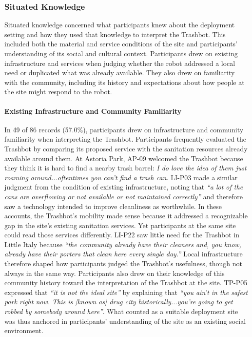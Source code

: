 \subsubsection{Situated Knowledge}
Situated knowledge concerned what participants knew about the deployment setting and how they used that knowledge to interpret the Trashbot. This included both the material and service conditions of the site and participants' understanding of its social and cultural context. Participants drew on existing infrastructure and services when judging whether the robot addressed a local need or duplicated what was already available. They also drew on familiarity with the community, including its history and expectations about how people at the site might respond to the robot.

\paragraph{Existing Infrastructure and Community Familiarity}
In 49 of 86 records (57.0\%), participants drew on infrastructure and community familiarity when interpreting the Trashbot. Participants frequently evaluated the Trashbot by comparing its proposed service with the sanitation resources already available around them. At Astoria Park, AP-09 welcomed the Trashbot because they think it is hard to find a nearby trash barrel: \emph{I do love the idea of them just roaming around...oftentimes you can't find a trash can.} LI-P03 made a similar judgment from the condition of existing infrastructure, noting that \emph{``a lot of the cans are overflowing or not available or not maintained correctly''} and therefore saw a technology intended to improve cleanliness as worthwhile. In these accounts, the Trashbot’s mobility made sense because it addressed a recognizable gap in the site’s existing sanitation services. Yet participants at the same site could read those services differently. LI-P22 saw little need for the Trashbot in Little Italy because \emph{``the community already have their cleaners and, you know, already have their porters that clean here every single day.''} Local infrastructure therefore shaped how participants judged the Trashbot’s usefulness, though not always in the same way. Participants also drew on their knowledge of this community history toward the interpretation of the Trashbot at the site. TP-P05 expressed that \emph{``it is not the ideal site''} by explaining that \emph{``you ain't in the safest park right now. This is [known as] drug city historically...you're going to get robbed by somebody around here''}. What counted as a suitable deployment site was thus anchored in participants’ understanding of the site as an existing social environment.

